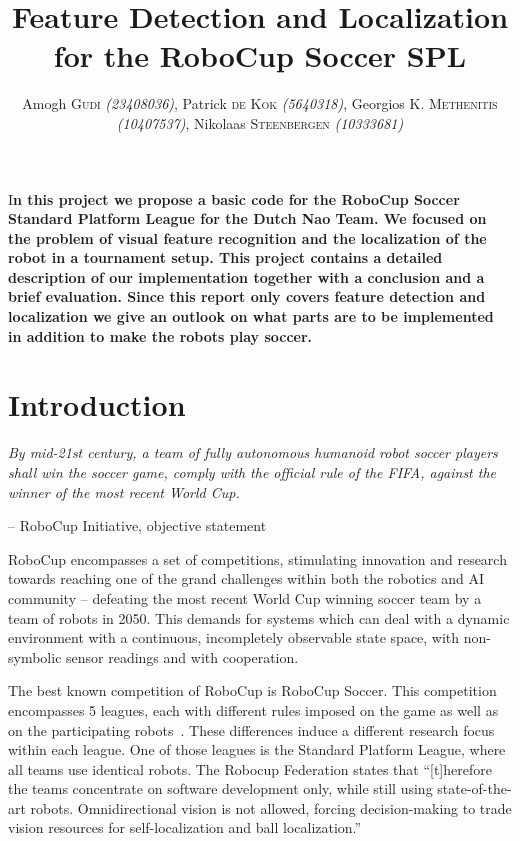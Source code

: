 \documentclass[	DIV=calc,%
							paper=a4,%
							fontsize=9pt,%
							twocolumn]{scrartcl}	 					%
\title{Feature Detection and Localization for the RoboCup Soccer SPL}					%
\author{Amogh \textsc{Gudi} {\small\emph{(23408036)}}, Patrick \textsc{de Kok} {\small\emph{(5640318)}},
        Georgios \textsc{K. Methenitis} {\small\emph{(10407537)}},
		Nikolaas \textsc{Steenbergen} {\small\emph{(10333681)}}\\}											%
\newcommand{\initial}[1]{%
     \lettrine[lines=3,lhang=0.3,nindent=0em]{
     				\color{DarkGoldenrod}
     				{\textsf{#1}}}{}}
\begin{document}
\maketitle
\thispagestyle{fancy} 			%
\initial{I}\textbf{n this project we propose a basic code for the RoboCup Soccer Standard Platform League for the Dutch Nao Team. We focused on the problem of visual feature recognition and the localization of the robot in a tournament setup. This project contains a detailed description of our implementation together with a conclusion and a brief evaluation. Since this report only covers feature detection and localization we give an outlook on what parts are to be implemented in addition to make the robots play soccer.}

\section{Introduction}
\textit{
By mid-21st century, a team of fully autonomous humanoid robot soccer players shall win the soccer game, comply with the official rule of the FIFA, against the winner of the most recent World Cup.}

\hfill -- RoboCup Initiative, objective statement~\cite{RoboCupObjective,kitano1997robocup}

RoboCup encompasses a set of competitions, stimulating innovation and research towards reaching one of the grand challenges within both the robotics and AI community -- defeating the most recent World Cup winning soccer team by a team of robots in 2050.  This demands for systems which can deal with a dynamic environment with a continuous, incompletely observable state space, with non-symbolic sensor readings and with cooperation.

The best known competition of RoboCup is RoboCup Soccer.  This competition encompasses 5 leagues, each with different rules imposed on the game as well as on the participating robots~\cite{RoboCupSPL}.  These differences induce a different research focus within each league.  One of those leagues is the Standard Platform League, where all teams use identical robots.  The Robocup Federation states that ``[t]herefore the teams concentrate on software development only, while still using state-of-the-art robots. Omnidirectional vision is not allowed, forcing decision-making to trade vision resources for self-localization and ball localization.''~\cite{RoboCupSPL}
\end{document}
